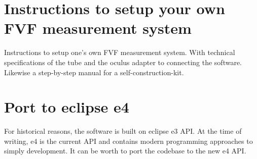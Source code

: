 \section{Instructions to setup your own FVF measurement system}
\label{development/follow-ups:instructions-to-setup-your-own-fvf-measurement-system}
Instructions to setup one's own FVF measurement system. With technical specifications of the tube and the oculus adapter to connecting the software. Likewise a step-by-step manual for a self-construction-kit.


\section{Port to eclipse e4}
\label{development/follow-ups:port-to-eclipse-e4}
For historical reasons, the software is built on eclipse e3 API. At the time of writing, e4 is the current API and contains modern programming approaches to simply development. It can be worth to port the codebase to the new e4 API.
\label{index:appendix-docs}